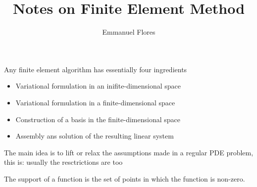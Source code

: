 \documentclass[11pt]{article}
\title{Notes on Finite Element Method}
\author{Emmanuel Flores}
\begin{document}
\maketitle
Any finite element algorithm has essentially four ingredients
\begin{itemize}
\item Variational formulation in an inifite-dimensional space
\item Variational formulation in a finite-dimensional space
\item Construction of a basis in the finite-dimensional space
\item Assembly ans solution of the resulting linear system
\end{itemize}
The main idea is to lift or relax the assumptions made in a regular PDE problem, this is: usually the resctrictions are too

The support of a function is the set of points in which the function is non-zero.
\end{document}
